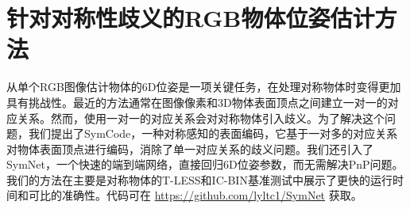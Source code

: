 \chapter{针对对称性歧义的RGB物体位姿估计方法}

从单个RGB图像估计物体的6D位姿是一项关键任务，在处理对称物体时变得更加具有挑战性。最近的方法通常在图像像素和3D物体表面顶点之间建立一对一的对应关系。然而，使用一对一的对应关系会对对称物体引入歧义。为了解决这个问题，我们提出了SymCode，一种对称感知的表面编码，它基于一对多的对应关系对物体表面顶点进行编码，消除了单一对应关系的歧义问题。我们还引入了SymNet，一个快速的端到端网络，直接回归6D位姿参数，而无需解决PnP问题。我们的方法在主要是对称物体的T-LESS和IC-BIN基准测试中展示了更快的运行时间和可比的准确性。代码可在 \color{magenta} \href{https://github.com/lyltc1/SymNet}{https://github.com/lyltc1/SymNet}\color{black} 获取。

